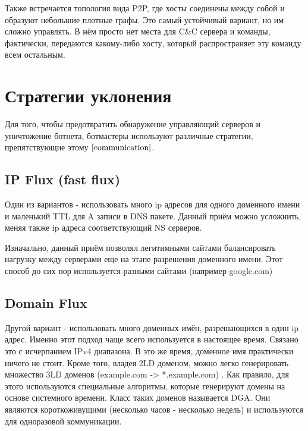 \documentclass[14pt]{extreport}
\begin{document}
	Также встречается топология вида P2P, где хосты соединены между собой и образуют небольшие плотные графы. Это самый устойчивый вариант, но им сложно управлять. В нём просто нет места для C\&C сервера и команды, фактически, передаются какому-либо хосту, который распространяет эту команду всем остальным.

	
	\newpage
	\section{Стратегии уклонения}
	Для того, чтобы предотвратить обнаружение управляющий серверов и уничтожение ботнета, ботмастеры используют различные стратегии, препятствующие этому $\cite{communication}$.
	\subsection{IP Flux (fast flux)}
	Один из вариантов - использовать много ip адресов для одного доменного имени и маленький TTL для A записи в DNS пакете. Данный приём можно усложнить, меняя также ip адреса соответствующий NS серверов.
	
	Изначально, данный приём позволял легитимными сайтами балансировать нагрузку между серверами еще на этапе разрешения доменного имени. Этот способ до сих пор используется разными сайтами (например google.com)
	
	\subsection{Domain Flux}
	Другой вариант - использовать много доменных имён, разрешающихся в один ip адрес. Именно этот подход чаще всего используется в настоящее время. Связано это с исчерпанием IPv4 диапазона. В это же время, доменное имя практически ничего не стоит. Кроме того, владея 2LD доменом, можно легко генерировать множество 3LD доменов (example.com -> *.example.com) .
	Как правило, для этого используются специальные алгоритмы, которые генерируют домены на основе системного времени. Класс таких доменов называется DGA. Они являются короткоживущими (несколько часов - несколько недель) и используются для одноразовой коммуникации. 
	
\end{document}
